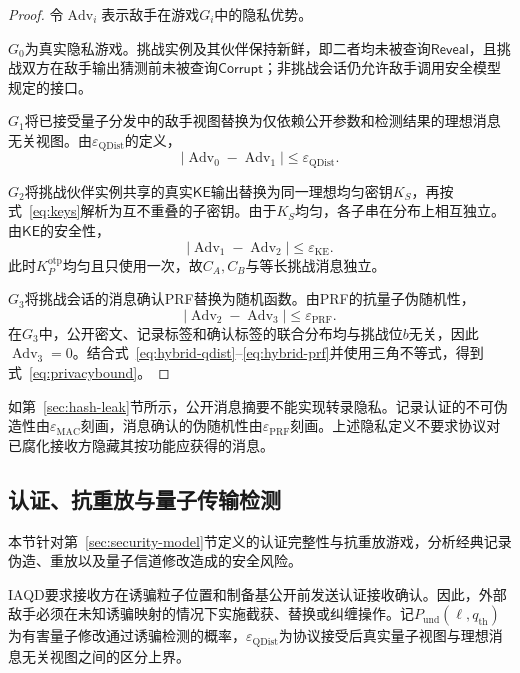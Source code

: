 \documentclass[UTF8,10pt,a4paper]{ctexart}
\theoremstyle{aqdplain}
\newcommand{\Adv}{\operatorname{Adv}}
\begin{document}
\begin{proof}
令$\Adv_i$表示敌手在游戏$G_i$中的隐私优势。

$G_0$为真实隐私游戏。挑战实例及其伙伴保持新鲜，即二者均未被查询$\mathsf{Reveal}$，且挑战双方在敌手输出猜测前未被查询$\mathsf{Corrupt}$；非挑战会话仍允许敌手调用安全模型规定的接口。

$G_1$将已接受量子分发中的敌手视图替换为仅依赖公开参数和检测结果的理想消息无关视图。由$\varepsilon_{\mathrm{QDist}}$的定义，
\begin{equation}
|\Adv_0-\Adv_1|
\leq\varepsilon_{\mathrm{QDist}}.
\label{eq:hybrid-qdist}
\end{equation}

$G_2$将挑战伙伴实例共享的真实$\mathsf{KE}$输出替换为同一理想均匀密钥$K_S$，再按式~\eqref{eq:keys}解析为互不重叠的子密钥。由于$K_S$均匀，各子串在分布上相互独立。由$\mathsf{KE}$的安全性，
\begin{equation}
|\Adv_1-\Adv_2|
\leq\varepsilon_{\mathrm{KE}}.
\label{eq:hybrid-ke}
\end{equation}
此时$K_P^{\mathrm{otp}}$均匀且只使用一次，故$C_A,C_B$与等长挑战消息独立。

$G_3$将挑战会话的消息确认PRF替换为随机函数。由PRF的抗量子伪随机性\citep{zhandry2012qprf}，
\begin{equation}
|\Adv_2-\Adv_3|
\leq\varepsilon_{\mathrm{PRF}}.
\label{eq:hybrid-prf}
\end{equation}
在$G_3$中，公开密文、记录标签和确认标签的联合分布均与挑战位$b$无关，因此$\Adv_3=0$。结合式~\eqref{eq:hybrid-qdist}--\eqref{eq:hybrid-prf}并使用三角不等式，得到式~\eqref{eq:privacybound}。
\end{proof}

如第~\ref{sec:hash-leak}节所示，公开消息摘要不能实现转录隐私。记录认证的不可伪造性由$\varepsilon_{\mathrm{MAC}}$刻画，消息确认的伪随机性由$\varepsilon_{\mathrm{PRF}}$刻画。上述隐私定义不要求协议对已腐化接收方隐藏其按功能应获得的消息。

\subsection{认证、抗重放与量子传输检测}

本节针对第~\ref{sec:security-model}节定义的认证完整性与抗重放游戏，分析经典记录伪造、重放以及量子信道修改造成的安全风险。

IAQD要求接收方在诱骗粒子位置和制备基公开前发送认证接收确认。因此，外部敌手必须在未知诱骗映射的情况下实施截获、替换或纠缠操作。记$P_{\mathrm{und}}(\ell,q_{\mathrm{th}})$为有害量子修改通过诱骗检测的概率，$\varepsilon_{\mathrm{QDist}}$为协议接受后真实量子视图与理想消息无关视图之间的区分上界。
\end{document}
